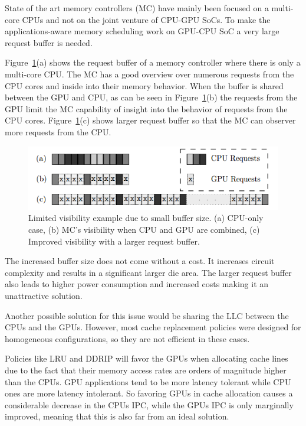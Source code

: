 \documentclass[12pt,journal,compsoc]{IEEEtran}
\begin{document}
State of the art memory controllers (MC) have mainly been focused on a multi-core CPUs and not on the joint venture of CPU-GPU SoCs.  To make the applications-aware memory scheduling work on GPU-CPU SoC a very large request buffer is needed.
 
Figure~\ref{fig:buff}(a) shows the request buffer of a memory controller where there is only a multi-core CPU.  The MC has a good overview over numerous requests from the CPU cores and inside into their memory behavior.  When the buffer is shared between the GPU and CPU, as can be seen in Figure~\ref{fig:buff}(b) the requests from the GPU limit the MC capability of insight into the behavior of requests from the CPU cores.  Figure~\ref{fig:buff}(c) shows larger request buffer so that the MC can observer more requests from the CPU.

\begin{figure}[H]
	\centering
	\includegraphics[width = 8 cm]{graphics/no1.png}
	\caption{Limited visibility example due to small buffer size. (a) CPU-only
		case, (b) MC’s visibility when CPU and GPU are combined, (c) Improved
		visibility with a larger request buffer.\cite{SmS}}\label{fig:buff}
\end{figure} 

The increased buffer size does not come without a cost. It increases circuit complexity and results in a significant larger die area. The larger request buffer also leads to higher power consumption and increased costs \cite{SmS} making it an unattractive solution. 

Another possible solution for this issue would be sharing the LLC between the CPUs and the GPUs. However, most cache replacement policies were designed for homogeneous configurations, so they are not efficient in these cases.

Policies like LRU and DDRIP will favor the GPUs when allocating cache lines due to the fact that their memory access rates are orders of magnitude higher than the CPUs. GPU applications tend to be more latency tolerant while CPU ones are more latency intolerant. So favoring GPUs in cache allocation causes a considerable decrease in the CPUs IPC, while the GPUs IPC is only marginally improved, meaning that this is also far from an ideal solution.
\end{document}
